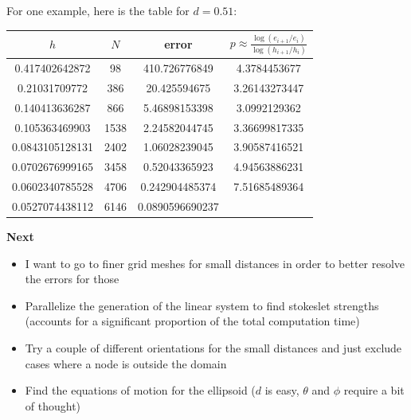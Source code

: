 \documentclass{article}
\newcommand{\tn}{\textnormal}
\begin{document}
\begin{itemize}
  For one example, here is the table for $d = 0.51$:
  \begin{center}
    \begin{tabular}{cccc} \toprule
      $h$ & $N$ & error & $p \approx \frac{\log(e_{i+1} /
                          e_i)}{\log(h_{i+1} / h_i)}$ \\ \midrule
      0.417402642872 & 98 & 410.726776849 & 4.3784453677 \\
      0.21031709772 & 386 & 20.425594675 & 3.26143273447 \\
      0.140413636287 & 866 & 5.46898153398 & 3.0992129362 \\
      0.105363469903 & 1538 & 2.24582044745 & 3.36699817335 \\
      0.0843105128131 & 2402 & 1.06028239045 & 3.90587416521 \\
      0.0702676999165 & 3458 & 0.52043365923 & 4.94563886231 \\
      0.0602340785528 & 4706 & 0.242904485374 & 7.51685489364 \\
      0.0527074438112 & 6146 & 0.0890596690237 &  \\ \bottomrule
    \end{tabular}
  \end{center}
\end{itemize}

\textbf{Next}
\begin{itemize}
\item I want to go to finer grid meshes for small distances in order
  to better resolve the errors for those
\item Parallelize the generation of the linear system to find
  stokeslet strengths (accounts for a significant proportion of the
  total computation time)
\item Try a couple of different orientations for the small distances
  and just exclude cases where a node is outside the domain
\item Find the equations of motion for the ellipsoid ($d$ is easy,
  $\theta$ and $\phi$ require a bit of thought)
\end{itemize}



\end{document}
